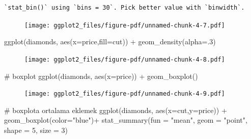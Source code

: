\documentclass[
  letterpaper,
  DIV=11,
  numbers=noendperiod]{scrreprt}
\newenvironment{Shaded}{\begin{snugshade}}{\end{snugshade}}
\newcommand{\AttributeTok}[1]{\textcolor[rgb]{0.40,0.45,0.13}{#1}}
\newcommand{\CommentTok}[1]{\textcolor[rgb]{0.37,0.37,0.37}{#1}}
\newcommand{\DecValTok}[1]{\textcolor[rgb]{0.68,0.00,0.00}{#1}}
\newcommand{\FunctionTok}[1]{\textcolor[rgb]{0.28,0.35,0.67}{#1}}
\newcommand{\NormalTok}[1]{\textcolor[rgb]{0.00,0.23,0.31}{#1}}
\newcommand{\SpecialCharTok}[1]{\textcolor[rgb]{0.37,0.37,0.37}{#1}}
\newcommand{\StringTok}[1]{\textcolor[rgb]{0.13,0.47,0.30}{#1}}
\begin{document}
\begin{verbatim}
`stat_bin()` using `bins = 30`. Pick better value with `binwidth`.
\end{verbatim}

\begin{figure}[H]

{\centering \texttt{[image: ggplot2\_files/figure-pdf/unnamed-chunk-4-7.pdf]}

}

\end{figure}

\begin{Shaded}
\begin{Highlighting}[]
\FunctionTok{ggplot}\NormalTok{(diamonds, }\FunctionTok{aes}\NormalTok{(}\AttributeTok{x=}\NormalTok{price,}\AttributeTok{fill=}\NormalTok{cut)) }\SpecialCharTok{+}
  \FunctionTok{geom\_density}\NormalTok{(}\AttributeTok{alpha=}\NormalTok{.}\DecValTok{3}\NormalTok{)}
\end{Highlighting}
\end{Shaded}

\begin{figure}[H]

{\centering \texttt{[image: ggplot2\_files/figure-pdf/unnamed-chunk-4-8.pdf]}

}

\end{figure}

\begin{Shaded}
\begin{Highlighting}[]
\CommentTok{\# boxplot}
\FunctionTok{ggplot}\NormalTok{(diamonds, }\FunctionTok{aes}\NormalTok{(}\AttributeTok{x=}\NormalTok{price)) }\SpecialCharTok{+}
  \FunctionTok{geom\_boxplot}\NormalTok{()}
\end{Highlighting}
\end{Shaded}

\begin{figure}[H]

{\centering \texttt{[image: ggplot2\_files/figure-pdf/unnamed-chunk-4-9.pdf]}

}

\end{figure}

\begin{Shaded}
\begin{Highlighting}[]
\CommentTok{\# boxplot\textquotesingle{}a ortalama eklemek}
\FunctionTok{ggplot}\NormalTok{(diamonds, }\FunctionTok{aes}\NormalTok{(}\AttributeTok{x=}\NormalTok{cut,}\AttributeTok{y=}\NormalTok{price)) }\SpecialCharTok{+}
  \FunctionTok{geom\_boxplot}\NormalTok{(}\AttributeTok{color=}\StringTok{"blue"}\NormalTok{)}\SpecialCharTok{+}
  \FunctionTok{stat\_summary}\NormalTok{(}\AttributeTok{fun =} \StringTok{"mean"}\NormalTok{, }\AttributeTok{geom =} \StringTok{"point"}\NormalTok{, }\AttributeTok{shape =} \DecValTok{5}\NormalTok{, }\AttributeTok{size =} \DecValTok{3}\NormalTok{)}
\end{Highlighting}
\end{Shaded}
\end{document}

